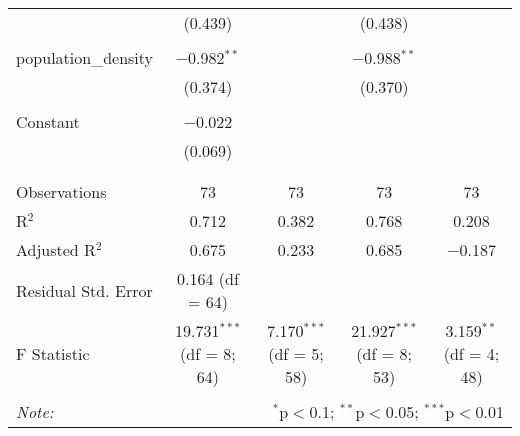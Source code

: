 \begin{table}[!htbp]
\begin{tabular}{@{\extracolsep{5pt}}lcccc}
  & (0.439) &  & (0.438) &  \\ 
  & & & & \\ 
 population\_density & $-$0.982$^{**}$ &  & $-$0.988$^{**}$ &  \\ 
  & (0.374) &  & (0.370) &  \\ 
  & & & & \\ 
 Constant & $-$0.022 &  &  &  \\ 
  & (0.069) &  &  &  \\ 
  & & & & \\ 
\hline \\[-1.8ex] 
Observations & 73 & 73 & 73 & 73 \\ 
R$^{2}$ & 0.712 & 0.382 & 0.768 & 0.208 \\ 
Adjusted R$^{2}$ & 0.675 & 0.233 & 0.685 & $-$0.187 \\ 
Residual Std. Error & 0.164 (df = 64) &  &  &  \\ 
F Statistic & 19.731$^{***}$ (df = 8; 64) & 7.170$^{***}$ (df = 5; 58) & 21.927$^{***}$ (df = 8; 53) & 3.159$^{**}$ (df = 4; 48) \\ 
\hline 
\hline \\[-1.8ex] 
\textit{Note:}  & \multicolumn{4}{r}{$^{*}$p$<$0.1; $^{**}$p$<$0.05; $^{***}$p$<$0.01} \\ 
\end{tabular} 
\end{table} 
